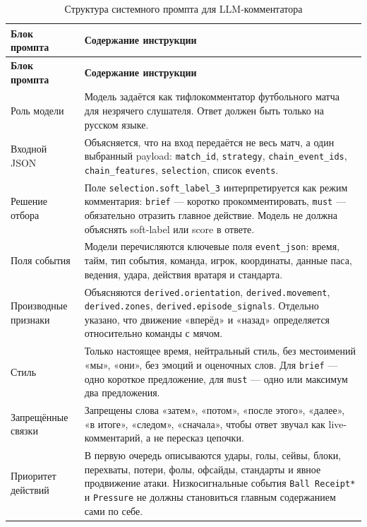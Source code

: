 \begin{longtable}{p{}p{}}
\caption{Структура системного промпта для LLM-комментатора}
\label{tab:system-prompt-structure}\\
\toprule
\textbf{Блок промпта} & \textbf{Содержание инструкции} \\
\midrule
\endfirsthead

\toprule
\textbf{Блок промпта} & \textbf{Содержание инструкции} \\
\midrule
\endhead

\bottomrule
\endfoot

Роль модели & Модель задаётся как тифлокомментатор футбольного матча для незрячего слушателя. Ответ должен быть только на русском языке. \\
Входной JSON & Объясняется, что на вход передаётся не весь матч, а один выбранный payload: \texttt{match\_id}, \texttt{strategy}, \texttt{chain\_event\_ids}, \texttt{chain\_features}, \texttt{selection}, список \texttt{events}. \\
Решение отбора & Поле \texttt{selection.soft\_label\_3} интерпретируется как режим комментария: \texttt{brief} --- коротко прокомментировать, \texttt{must} --- обязательно отразить главное действие. Модель не должна объяснять soft-label или score в ответе. \\
Поля события & Модели перечисляются ключевые поля \texttt{event\_json}: время, тайм, тип события, команда, игрок, координаты, данные паса, ведения, удара, действия вратаря и стандарта. \\
Производные признаки & Объясняются \texttt{derived.orientation}, \texttt{derived.movement}, \texttt{derived.zones}, \texttt{derived.episode\_signals}. Отдельно указано, что движение «вперёд» и «назад» определяется относительно команды с мячом. \\
Стиль & Только настоящее время, нейтральный стиль, без местоимений «мы», «они», без эмоций и оценочных слов. Для \texttt{brief} --- одно короткое предложение, для \texttt{must} --- одно или максимум два предложения. \\
Запрещённые связки & Запрещены слова «затем», «потом», «после этого», «далее», «в итоге», «следом», «сначала», чтобы ответ звучал как live-комментарий, а не пересказ цепочки. \\
Приоритет действий & В первую очередь описываются удары, голы, сейвы, блоки, перехваты, потери, фолы, офсайды, стандарты и явное продвижение атаки. Низкосигнальные события \texttt{Ball Receipt*} и \texttt{Pressure} не должны становиться главным содержанием сами по себе. \\

\end{longtable}
